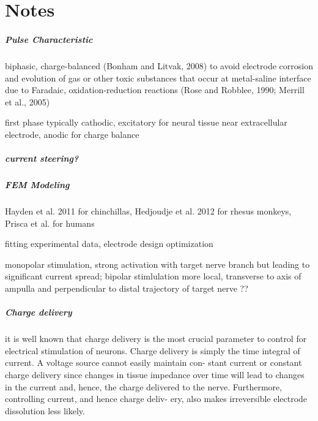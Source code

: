 \chapter{Notes}\label{sec:notes}
\paragraph*{Pulse Characteristic}
biphasic, charge-balanced (Bonham and Litvak, 2008) to avoid electrode corrosion and evolution of gas or other toxic substances that occur at metal-saline interface due to Faradaic, oxidation-reduction reactions (Rose and Robblee, 1990; Merrill et al., 2005)

first phase typically cathodic, excitatory for neural tissue near extracellular electrode, anodic for charge balance

\paragraph*{current steering?}

\paragraph*{FEM Modeling}
Hayden et al. 2011 for chinchillas, Hedjoudje et al. 2012 for rhesus monkeys, Prisca et al. for humans

fitting experimental data, electrode design optimization

monopolar stimulation, strong activation with target nerve branch but leading to significant current spread; bipolar stimlulation more local, transverse to axis of ampulla and perpendicular to distal trajectory of target nerve ??

\paragraph*{Charge delivery}
it is well known that charge delivery is the most crucial parameter to control for electrical stimulation of neurons. Charge delivery is simply the time integral of current. A voltage source cannot easily maintain con- stant current or constant charge delivery since changes in tissue impedance over time will lead to changes in the current and, hence, the charge delivered to the nerve. Furthermore, controlling current, and hence charge deliv- ery, also makes irreversible electrode dissolution less likely.

